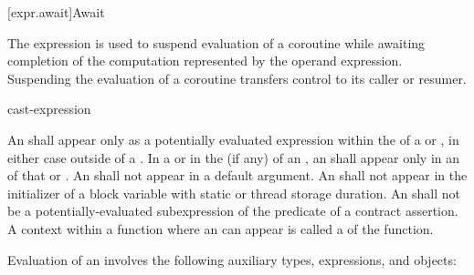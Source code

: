 [expr.await]{Await}
%
%

\pnum
The  expression is used to suspend evaluation of a
coroutine while awaiting completion of
the computation represented by the operand expression.
Suspending the evaluation of a coroutine
transfers control to its caller or resumer.

\begin{bnf}
\br
     cast-expression
\end{bnf}

\pnum
An  shall appear only as a potentially evaluated
expression within the  of a
 or ,
in either case
outside of a .
In a  or in the
 (if any)
of an , an 
shall appear only in an  of that
 or .
An  shall not appear in a
default argument.
An  shall not appear in the initializer of
a block variable with static or thread storage duration.
An  shall not be
a potentially-evaluated subexpression
of the predicate of a contract assertion.
A context within a function where an  can appear
is called a  of the function.

\pnum
Evaluation of an  involves the following
auxiliary types, expressions, and objects:

